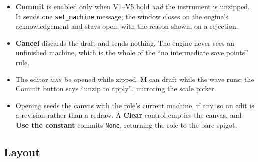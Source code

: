 \documentclass[11pt,a4paper]{article}
\newcommand{\MAY}{\textsc{may}}
\theoremstyle{definition}
\theoremstyle{plain}
\theoremstyle{remark}
\begin{document}
\begin{itemize}[leftmargin=*,itemsep=2pt]
\item \textbf{Commit} is enabled only when V1--V5 hold \emph{and} the instrument is unzipped. It
  sends one \texttt{set\_machine} message; the window closes on the engine's acknowledgement and
  stays open, with the reason shown, on a rejection.
\item \textbf{Cancel} discards the draft and sends nothing. The engine never sees an unfinished
  machine, which is the whole of the ``no intermediate save points'' rule.
\item The editor \MAY{} be opened while zipped. M can draft while the wave runs; the Commit button
  says ``unzip to apply'', mirroring the scale picker.
\item Opening seeds the canvas with the role's current machine, if any, so an edit is a revision
  rather than a redraw. A \textbf{Clear} control empties the canvas, and \textbf{Use the constant}
  commits \texttt{None}, returning the role to the bare spigot.
\end{itemize}

\subsection{Layout}
\end{document}
